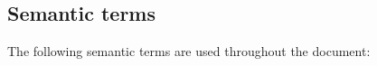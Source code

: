 \documentclass{article}
\begin{document}
\subsection{Semantic terms}

The following semantic terms are used throughout the document:

\newcommand{\septext}{0.5em}
\newcommand{\gentextwithline}[6]{
\draw (#2,#3) node[left] {#1};
\draw[#6] (#2+\septext+#4,#3) -- +(#5,0);
}
\newcommand{\timeline}[1]{\gentextwithline{Time}{0}{#1}{0}{25em}{->,dashed}}
\newcommand{\operation}[2]{\gentextwithline{Operation}{0}{#1}{1em}{#2}{|-|}}
\newcommand{\gencall}[3]{\gentextwithline{#1}{0}{#2}{0}{#3}{|-|}}
\newcommand{\call}[2]{\gencall{Call}{#1}{#2}}
\newcommand{\calls}[2]{\gencall{Calls}{#1}{#2-10em};
\draw[|-|] (#2-8em,#1) -- +(8em,0);
}
\newcommand{\wait}[3]{\gentextwithline{Wait}{#1}{#2}{0}{#3}{|-|}}
\newcommand{\progress}[2]{\gentextwithline{Progress}{0}{#1}{1em}{#2}{|-|}}
\end{document}
